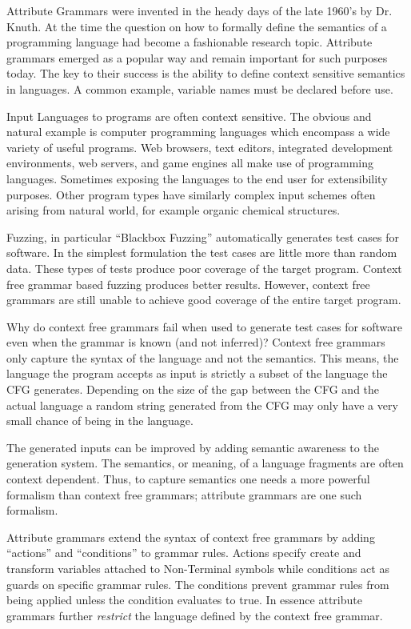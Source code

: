 
Attribute Grammars were invented in the heady days of the late 1960's by Dr.
Knuth.\cite{Knuth1990} At the time the question on how to formally define the
semantics of a programming language had become a fashionable research topic.
Attribute grammars emerged as a popular way and remain important for such
purposes today. The key to their success is the ability to define context
sensitive semantics in languages. A common example, variable names must be
declared before use.

Input Languages to programs are often context sensitive. The obvious and natural
example is computer programming languages which encompass a wide variety of
useful programs. Web browsers, text editors, integrated development
environments, web servers, and game engines all make use of programming
languages. Sometimes exposing the languages to the end user for extensibility
purposes. Other program types have similarly complex input schemes often arising
from natural world, for example organic chemical structures.

Fuzzing, in particular ``Blackbox Fuzzing'' automatically generates test cases
for software. In the simplest formulation the test cases are little more than
random data. These types of tests produce poor coverage of the target program.
Context free grammar based fuzzing produces better results. However, context
free grammars are still unable to achieve good coverage of the entire target
program. 

Why do context free grammars fail when used to generate test cases for software
even when the grammar is known (and not inferred)? Context free grammars only
capture the syntax of the language and not the semantics. This means, the
language the program accepts as input is strictly a subset of the language the
CFG generates. Depending on the size of the gap between the CFG and the actual
language a random string generated from the CFG may only have a very small
chance of being in the language.

The generated inputs can be improved by adding semantic awareness to the
generation system. The semantics, or meaning, of a language fragments are often
context dependent. Thus, to capture semantics one needs a more powerful
formalism than context free grammars; attribute grammars are one such formalism.

Attribute grammars extend the syntax of context free grammars by adding
``actions'' and ``conditions'' to grammar rules. Actions specify create and
transform variables attached to Non-Terminal symbols while conditions act as
guards on specific grammar rules. The conditions prevent grammar rules from
being applied unless the condition evaluates to true. In essence attribute
grammars further \textit{restrict} the language defined by the context free
grammar. 

